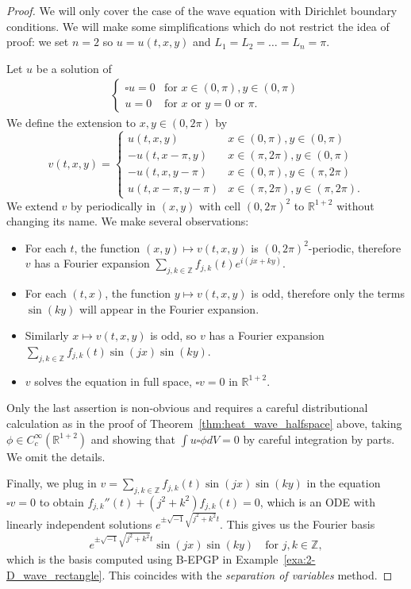 \documentclass{article} %
\theoremstyle{plain}
\theoremstyle{definition}
\theoremstyle{remark}
\newcommand{\RR}{\mathbb{R}}
\begin{document}
\begin{proof}
    We will only cover the case of the wave equation with Dirichlet boundary conditions. We will make some  simplifications which do not restrict the idea of proof: we set $n=2$ so $u=u(t,x,y)$ and  $L_1=L_2=\ldots=L_n=\pi$. 
    
     Let $u$ be a solution of
     \begin{align*}
        \begin{cases} 
     \square u=0&\text{for }x\in(0,\pi), y\in(0,\pi)\\
          u=0&\text{for }x\text{ or }y=0\text{ or }\pi.
         \end{cases}
     \end{align*}
    We define the extension to $x,y\in(0,2\pi)$ by
    $$
    v(t,x,y)=\begin{cases}
        u(t,x,y)&x\in(0,\pi), y\in(0,\pi)\\
        -u(t,x-\pi,y)&x\in(\pi,2\pi), y\in(0,\pi)\\
        -u(t,x,y-\pi)&x\in(0,\pi), y\in(\pi,2\pi)\\
        u(t,x-\pi,y-\pi)&x\in(\pi,2\pi), y\in(\pi,2\pi).
    \end{cases}
    $$
    We extend $v$ by periodically in $(x,y)$ with cell $(0,2\pi)^2$ to $\RR^{1+2}$ without changing its name. We make several observations:
\begin{itemize}
    \item
For each $t$, the function $(x,y)\mapsto v(t,x,y)$ is $(0,2\pi)^2$-periodic, therefore $v$ has a Fourier expansion $\sum_{j,k\in\mathbb Z} f_{j,k}(t) e^{i(jx+ky)}$.
\item For each $(t,x)$, the function $y\mapsto v(t,x,y)$ is odd, therefore only the terms $\sin(ky)$ will appear in the Fourier expansion.
\item Similarly $x\mapsto v(t,x,y)$ is odd, so $v$ has a Fourier expansion $\sum_{j,k\in\mathbb Z} f_{j,k}(t) \sin(jx)\sin(ky)$.
\item $v$ solves the equation in full space, $\square v=0$ in $\RR^{1+2}$.
\end{itemize}
Only the last assertion is non-obvious and requires a careful distributional calculation as in the proof of Theorem~\ref{thm:heat_wave_halfspace} above, taking $\phi \in C_c^\infty(\RR^{1+2})$ and showing that $\int u\square \phi dV=0$ by careful integration by parts. We omit the details.

Finally, we plug in $v=\sum_{j,k\in\mathbb Z} f_{j,k}(t) \sin(jx)\sin(ky)$ in the equation $\square v=0$ to obtain $f_{j,k}''(t)+(j^2+k^2)f_{j,k}(t)=0$, which is an ODE with linearly independent solutions $e^{\pm \sqrt{-1}\sqrt{j^2+k^2}t}$. This gives us the Fourier basis
$$
e^{\pm \sqrt{-1}\sqrt{j^2+k^2}t}\sin(jx)\sin(ky)\quad\text{for }j,k\in\mathbb Z,
$$
which is the basis computed using B-EPGP in Example~\ref{exa:2-D_wave_rectangle}. This coincides with the \emph{separation of variables} method.
\end{proof}
\end{document}

